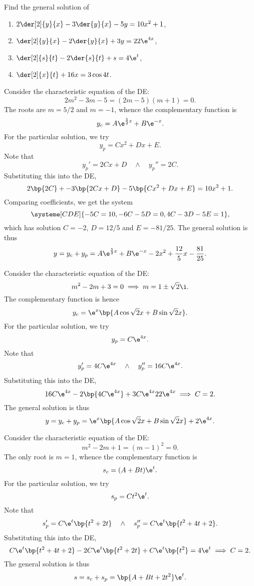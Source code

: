 \begin{problem}
    Find the general solution of
    \begin{enumerate}
        \item $2\der[2]{y}{x} - 3\der{y}{x} - 5y = 10x^2 + 1$,
        \item $\der[2]{y}{x} - 2\der{y}{x} + 3y = 22\e^{4x}$,
        \item $\der[2]{s}{t} - 2\der{s}{t} + s = 4\e^t$,
        \item $\der[2]{x}{t} + 16x = 3\cos 4t$.
    \end{enumerate}
\end{problem}
\begin{solution}
    \begin{ppart}
        Consider the characteristic equation of the DE: \[2m^2 - 3m - 5 = (2m-5)(m+1) = 0.\] The roots are $m = 5/2$ and $m = -1$, whence the complementary function is \[y_c = A \e^{\frac52x} + B \e^{-x}.\] For the particular solution, we try \[y_p = Cx^2 + Dx + E.\] Note that \[y_p' = 2Cx + D \quad \land \quad y_p'' = 2C.\] Substituting this into the DE, \[2\bp{2C} + -3\bp{2Cx + D} - 5\bp{Cx^2 + Dx + E} = 10x^2 + 1.\] Comparing coefficients, we get the system \[\systeme[CDE]{-5C = 10,-6C-5D = 0,4C-3D-5E=1},\] which has solution $C = -2$, $D = 12/5$ and $E = -81/25$. The general solution is thus \[y = y_c + y_p = A \e^{\frac52x} + B \e^{-x} - 2x^2 + \frac{12}5 x - \frac{81}{25}.\]
    \end{ppart}
    \begin{ppart}
        Consider the characteristic equation of the DE: \[m^2 - 2m + 3 = 0 \implies m = 1 \pm \sqrt{2} \i.\] The complementary function is hence \[y_c = \e^x \bp{A\cos \sqrt{2}x + B\sin \sqrt{2}x}.\] For the particular solution, we try \[y_p = C\e^{4x}.\] Note that \[y_p' = 4C\e^{4x} \quad \land \quad y_p'' = 16C\e^{4x}.\] Substituting this into the DE, \[16C\e^{4x} - 2\bp{4C\e^{4x}} + 3C\e^{4x}  22\e^{4x} \implies C = 2.\] The general solution is thus \[y = y_c + y_p = \e^x \bp{A \cos \sqrt{2}x + B \sin \sqrt{2}x} + 2\e^{4x}.\]
    \end{ppart}
    \begin{ppart}
        Consider the characteristic equation of the DE: \[m^2 - 2m + 1 = (m-1)^2 = 0.\] The only root is $m = 1$, whence the complementary function is \[s_c = (A + Bt) \e^{t}.\] For the particular solution, we try \[s_p = Ct^2 \e^t.\] Note that \[s_p' = C\e^t\bp{t^2 + 2t} \quad \land \quad s_p'' = C\e^t \bp{t^2 + 4t + 2}.\] Substituting this into the DE, \[C\e^t \bp{t^2 + 4t + 2} - 2C\e^t \bp{t^2 + 2t} + C\e^t \bp{t^2} = 4\e^t \implies C = 2.\] The general solution is thus \[s = s_c + s_p = \bp{A + Bt + 2t^2} \e^{t}.\]

\end{ppart}
\end{solution}
